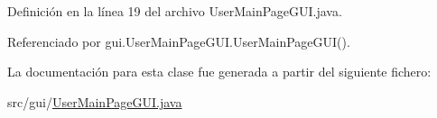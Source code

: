 Definición en la línea 19 del archivo User\+Main\+Page\+G\+U\+I.\+java.



Referenciado por gui.\+User\+Main\+Page\+G\+U\+I.\+User\+Main\+Page\+G\+U\+I().



La documentación para esta clase fue generada a partir del siguiente fichero\+:\begin{DoxyCompactItemize}
\item 
src/gui/\mbox{\hyperlink{UserMainPageGUI_8java}{User\+Main\+Page\+G\+U\+I.\+java}}\end{DoxyCompactItemize}

